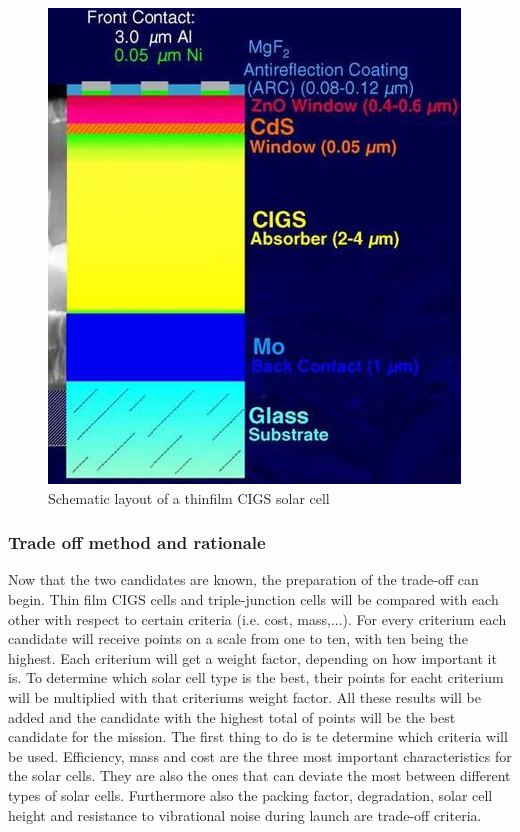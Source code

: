 \begin{figure}
\includegraphics{chapters/img/thinfilm_solar_cell.png}
\caption{Schematic layout of a thinfilm CIGS solar cell}
\label{fig:thinfilm_cell}
\end{figure}

\subsubsection{Trade off method and rationale}
\label{TO_weight}
Now that the two candidates are known, the preparation of the trade-off can begin. Thin film CIGS cells and triple-junction cells will be compared with each other with respect to certain criteria (i.e. cost, mass,...). For every criterium each candidate will receive points on a scale from one to ten, with ten being the highest. Each criterium will get a weight factor, depending on how important it is. To determine which solar cell type is the best, their points for eacht criterium will be multiplied with that criteriums weight factor. All these results will be added and the candidate with the highest total of points will be the best candidate for the mission. 
The first thing to do is te determine which criteria will be used. Efficiency, mass and cost are the three most important characteristics for the solar cells. They are also the ones that can deviate the most between different types of solar cells. Furthermore also the packing factor, degradation, solar cell height and resistance to vibrational noise during launch are trade-off criteria. 

